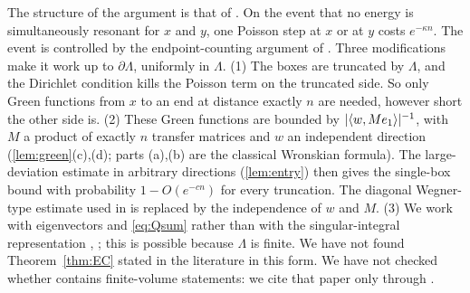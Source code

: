 \begin{remark}\label{rem:ECproof}
The structure of the argument is that of \cite[Sect.~2]{Macera2023}.  On the event that no energy is
simultaneously resonant for $x$ and $y$, one Poisson step at $x$ or at $y$ costs $e^{-\kappa n}$.  The
event is controlled by the endpoint-counting argument of \cite[Sect.~2.3, Claims~2.3--2.4]{MaceraSodin2022}.
Three modifications make it work up to $\partial\Lambda$, uniformly in $\Lambda$.
(1) The boxes are truncated by $\Lambda$, and the Dirichlet condition kills the Poisson term on the
truncated side.  So only Green functions from $x$ to an end at distance exactly $n$ are needed, however
short the other side is.
(2) These Green functions are bounded by $|\langle w,Me_1\rangle|^{-1}$, with $M$ a product of exactly $n$
transfer matrices and $w$ an independent direction (\cref{lem:green}(c),(d); parts (a),(b) are the
classical Wronskian formula).  The large-deviation estimate in
arbitrary directions (\cref{lem:entry}) then gives the single-box bound with probability $1-O(e^{-cn})$
for every truncation.  The diagonal Wegner-type estimate \cite[Prop.~1.3]{MaceraSodin2022} used in
\cite[Claim~2.4]{MaceraSodin2022} is replaced by the independence of $w$ and $M$.
(3) We work with eigenvectors and \eqref{eq:Qsum} rather than with the singular-integral representation
\cite[Eq.~(23)]{MaceraSodin2022}, \cite[Eq.~(6)]{Macera2023}; this is possible because $\Lambda$ is finite.
We have not found Theorem~\ref{thm:EC} stated in the literature in this form.  We have not checked
whether \cite{GeZhao2020} contains finite-volume statements: we cite that paper only through
\cite[Thm.~1.1]{Macera2023}.
\end{remark}

